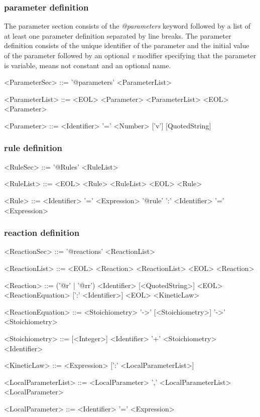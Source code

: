 \documentclass[a4paper]{article}
\begin{document}
\subsubsection*{parameter definition}
The parameter section consists of the \emph{@parameters} keyword followed by a list of at least one parameter definition separated by line breaks. The parameter definition consists of the unique identifier of the parameter and the initial value of the parameter followed by an optional \emph{v} modifier specifying that the parameter is variable, means not constant and an optional name.

\begin{table} [h!]
\begin{grammar}
<ParameterSec> ::= '@parameters' <ParameterList>

<ParameterList> ::= <EOL> <Parameter> <ParameterList>
  \alt <EOL> <Parameter>
  
<Parameter> ::= <Identifier> '=' <Number> ['v'] [QuotedString]
\end{grammar}
\end{table}


\subsubsection*{rule definition}
\begin{table}[h!]
\begin{grammar}
<RuleSec> ::= '@Rules' <RuleList>

<RuleList> ::= <EOL> <Rule> <RuleList>
  \alt <EOL> <Rule>
  
<Rule> ::= <Identifier> '=' <Expression>
\alt '@rule' ':' <Identifier> '=' <Expression>
\end{grammar}
\end{table}


\subsubsection*{reaction definition}
\begin{table}[h!]
\begin{grammar}
<ReactionSec> ::= '@reactions' <ReactionList>

<ReactionList> ::= <EOL> <Reaction> <ReactionList>
  \alt <EOL> <Reaction>
  
<Reaction> ::= ('@r' | '@rr') <Identifier> [<QuotedString>] <EOL> <ReactionEquation> [':' <Identifier>] <EOL> <KineticLaw>

<ReactionEquation> ::= <Stoichiometry> '->' [<Stoichiometry>]
  \alt '->' <Stoichiometry>
  
<Stoichiometry> ::= [<Integer>] <Identifier> '+' <Stoichiometry>
  \alt [<Integer>] <Identifier>
  
<KineticLaw> ::= <Expression> [':' <LocalParameterList>]

<LocalParameterList> ::= <LocalParameter> ',' <LocalParameterList>
  \alt <LocalParameter>
  
<LocalParameter> ::= <Identifier> '=' <Expression>
\end{grammar}
\end{table}
\end{document}
